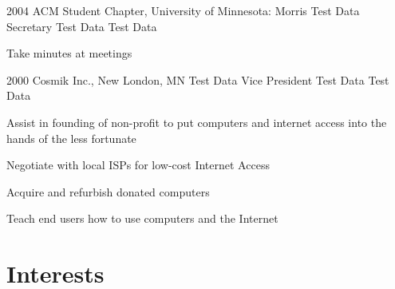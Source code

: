 \documentclass[10pt]{article} %
\begin{document}

\job
{2004}
{ACM Student Chapter, University of Minnesota: Morris}
{Test Data}
{Secretary}
{Test Data}
{Test Data}

\begin{itemize-noindent}
\item{Take minutes at meetings}
\end{itemize-noindent}

\job
{2000}
{Cosmik Inc., New London, MN}
{Test Data}
{Vice President}
{Test Data}
{Test Data}

\begin{itemize-noindent}
\item{Assist in founding of non-profit to put computers and internet access into the hands of the less fortunate}
\item{Negotiate with local ISPs for low-cost Internet Access}
\item{Acquire and refurbish donated computers}
\item{Teach end users how to use computers and the Internet}
\end{itemize-noindent}


\section{Interests}


\end{document}
